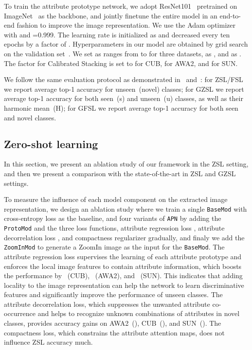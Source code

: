 To train the attribute prototype network, we adopt ResNet101~\citep{he2016deep} pretrained on ImageNet~\citep{39_Imagenet} as the backbone, and jointly finetune the entire model in an end-to-end fashion to improve the image representation.
We use the Adam optimizer~\citep{kingma2014adam} with  and =0.999. The learning rate is initialized as  and decreased every ten epochs by a factor of . Hyperparameters in our model are obtained by grid search on the validation set~\citep{xian2018zero}. We set  as ranges from  to  for three datasets,  as , and  as .
The factor  for Calibrated Stacking is set to  for CUB,  for AWA2, and  for SUN.

We follow the same evaluation protocol as demonstrated in~\citet{xian2018zero} and~\citet{xian2019}: for ZSL/FSL we report average top-1 accuracy for unseen~(novel) classes; for GZSL we report average top-1 accuracy for both seen~(s) and unseen~(u) classes, as well as their harmonic mean~(H); for GFSL we report average top-1 accuracy for both seen and novel classes.





\subsection{Zero-shot learning}
In this section, we present an ablation study of our framework in the ZSL setting, and then we present a comparison with the state-of-the-art in ZSL and GZSL settings.

 To measure the influence of each model component on the extracted image representation, we design an ablation study where we train a single \texttt{BaseMod} with cross-entropy loss as the baseline, and four variants of \texttt{APN} by adding the \texttt{ProtoMod} and the three loss functions, attribute regression loss , attribute decorrelation loss , and compactness regularizer  gradually, and finaly we add the \texttt{ZoomInMod} to generate a ZoomIn image as the input for the \texttt{BaseMod}. 
The attribute regression loss supervises the learning of each attribute prototype and enforces the local image features to contain attribute information, which boosts the performance by ~(CUB), ~(AWA2), and ~(SUN). This indicates that adding locality to the image representation can help the network to learn discriminative features and significantly improve the performance of unseen classes. The attribute decorrelation loss, which suppresses the unwanted attribute co-occurrence and helps to recognize unknown combinations of attributes in novel classes, provides accuracy gains on AWA2~(), CUB~(), and SUN~(). The compactness loss, which constrains the attribute attention maps, does not influence ZSL accuracy much. 



